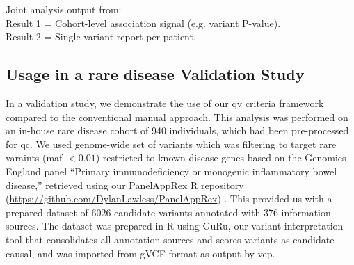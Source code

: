 \begin{tcolorbox}[
    colback=white!0,
    colframe=black,
    boxrule=1pt,
    arc=1mm,
    outer arc=1mm,
    title=\textbf{\refstepcounter{myboxcounter}\label{box:pipe}Box \themyboxcounter: Example diagrammatic representation}
]
\medskip

Joint analysis output from:\\
Result 1 = Cohort-level association signal (e.g. variant P-value).\\
Result 2 = Single variant report per patient.
\end{tcolorbox}

\subsection{Usage in a rare disease Validation Study}

In a validation study, we demonstrate the use of our \ac{qv} criteria framework 
compared to the conventional manual approach. 
This analysis was performed on an in-house rare disease cohort of 940 individuals, which had been pre-processed for \ac{qc}. %
We used genome-wide set of variants which was filtering to target rare varaints (\ac{maf} $< 0.01$) restricted to known disease genes based on the Genomics England panel ``Primary immunodeficiency or monogenic inflammatory bowel disease,'' retrieved using our PanelAppRex R repository (\url{https://github.com/DylanLawless/PanelAppRex}) 
\cite{lawless_panelapprex_2025}. 
This provided us with a prepared dataset of 6026 candidate variants annotated with 376 information sources.
The dataset was prepared in R using GuRu, our variant interpretation tool that consolidates all annotation sources and scores variants as candidate causal, and was imported from gVCF format as output by \ac{vep}.

